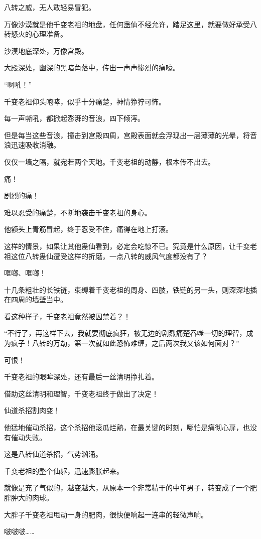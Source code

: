 \begin{this_body}
八转之威，无人敢轻易冒犯。

万像沙漠就是他千变老祖的地盘，任何蛊仙不经允许，踏足这里，就要做好承受八转怒火的心理准备。

沙漠地底深处，万像宫殿。

大殿深处，幽深的黑暗角落中，传出一声声惨烈的痛嚎。

“啊吼！”

千变老祖仰头咆哮，似乎十分痛楚，神情狰狞可怖。

每一声嘶吼，都掀起澎湃的音浪，四下倾泻。

但是每当这些音浪，撞击到宫殿四周，宫殿表面就会浮现出一层薄薄的光晕，将音浪迅速吸收消融。

仅仅一墙之隔，就宛若两个天地。千变老祖的动静，根本传不出去。

痛！

剧烈的痛！

难以忍受的痛楚，不断地袭击千变老祖的身心。

他额头上青筋冒起，终于忍受不住，痛得在地上打滚。

这样的情景，如果让其他蛊仙看到，必定会吃惊不已。究竟是什么原因，让千变老祖这位八转蛊仙遭受这样的折磨，一点八转的威风气度都没有了？

哐啷、哐啷！

十几条粗壮的长铁链，束缚着千变老祖的周身、四肢，铁链的另一头，则深深地插在四周的墙壁当中。

看这种样子，千变老祖竟然被囚禁着？！

“不行了，再这样下去，我就要彻底疯狂，被无边的剧烈痛楚吞噬一切的理智，成为疯子！八转的万劫，第一次就如此恐怖难缠，之后两次我又该如何面对？”

可恨！

千变老祖的眼眸深处，还有最后一丝清明挣扎着。

借助这丝清明和理智，千变老祖终于做出了决定！

仙道杀招割肉变！

他猛地催动杀招，这个杀招他滚瓜烂熟，在最关键的时刻，哪怕是痛彻心扉，也没有催动失败。

这是八转仙道杀招，气势汹涌。

千变老祖的整个仙躯，迅速膨胀起来。

就像是充了气似的，越变越大，从原本一个非常精干的中年男子，转变成了一个肥胖肿大的肉球。

大胖子千变老祖甩动一身的肥肉，很快便响起一连串的轻微声响。

啵啵啵……


\end{this_body}

